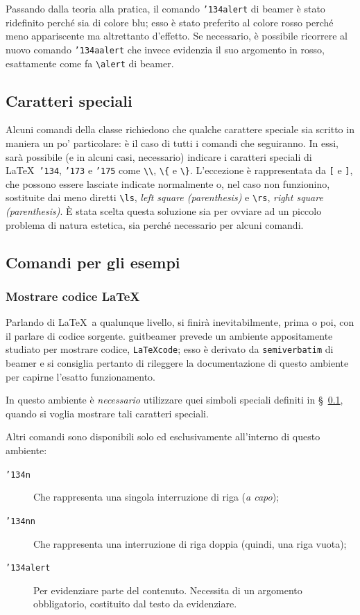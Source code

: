 \documentclass[a4paper,10pt]{article}
\newcommand{\lcap}{{\fontencoding{T1}\selectfont\guillemotleft}}
\newcommand{\rcap}{{\fontencoding{T1}\selectfont\guillemotright}}
\newcommand{\Cap}[1]{\lcap #1\rcap}
\newcommand{\bs}{{\char'134}}%
\newcommand{\lb}{{\char'173}}%
\newcommand{\rb}{{\char'175}}%
\newcommand{\ls}{{\char'133}}%
\newcommand{\rs}{{\char'135}}%
\newcommand{\pkg}[1]{\textsf{#1}}
\let\cls\pkg
\newcommand{\env}[1]{\texttt{#1}}
\newcommand{\cmd}[1]{\texttt{\bs #1}}
\begin{document}
Passando dalla teoria alla pratica, il comando \cmd{alert} di
\cls{beamer} è stato ridefinito perché sia di colore blu; esso è stato
preferito al colore rosso perché meno appariscente ma altrettanto
d'effetto. Se necessario, è possibile ricorrere al nuovo comando
\cmd{aalert} che invece evidenzia il suo argomento in rosso,
esattamente come fa \verb+\alert+ di \cls{beamer}.

\subsection{Caratteri speciali}\label{sec:sp_char}
Alcuni comandi della classe richiedono che qualche carattere speciale
sia scritto in maniera un po' particolare: è il caso di
tutti i comandi che seguiranno. In essi, sarà possibile (e in alcuni
casi, necessario) indicare i caratteri speciali di \LaTeX\
\texttt{\bs}, \texttt{\lb} e \texttt{\rb} come \verb+\\+, \verb+\{+ e
\verb+\}+. L'eccezione è rappresentata da \verb+[+ e \verb+]+, che
possono essere lasciate indicate normalmente o, nel caso non
funzionino, sostituite dai meno diretti \verb+\ls+,
\textit{left square (parenthesis)} e \verb+\rs+, \textit{right square
(parenthesis)}. \`E stata scelta questa soluzione sia per ovviare ad un
piccolo problema di natura estetica, sia perché necessario per alcuni
comandi.

\subsection{Comandi per gli esempi}
\subsubsection{Mostrare codice \LaTeX}
Parlando di \LaTeX\ a qualunque livello, si finirà inevitabilmente,
prima o poi, con il parlare di codice sorgente. \cls{guitbeamer}
prevede un ambiente appositamente studiato per mostrare codice,
\env{LaTeXcode}; esso è derivato da \env{semiverbatim} di \cls{beamer}
e si consiglia pertanto di rileggere la documentazione di questo
ambiente \cite{manbeamer} per capirne l'esatto funzionamento.

In questo ambiente è \emph{necessario} utilizzare quei simboli
speciali definiti in \S~\ref{sec:sp_char}, quando si voglia
\Cap{mostrare} tali caratteri speciali.

Altri comandi sono disponibili solo ed esclusivamente all'interno di
questo ambiente:
\begin{description}
	\item[\cmd{n}]Che rappresenta una singola interruzione di
	  riga (\emph{a capo});
	\item[\cmd{nn}]Che rappresenta una interruzione di riga
		doppia (quindi, una riga vuota);
	\item[\cmd{alert}]Per evidenziare parte del contenuto.
	  Necessita di un argomento obbligatorio, costituito dal testo
	  da evidenziare.
\end{description}
\end{document}
